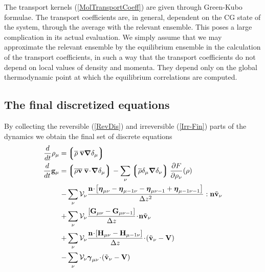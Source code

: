 \documentclass[b5paper,openright,11pt]{book}
\newcommand{\esc}{\!\cdot\!}
\newcommand{\llg}{\left\lgroup}
\newcommand{\rlg}{\right\rgroup}
\begin{document}
The  transport  kernels  (\ref{MolTransportCoeff}) are  given  through
Green-Kubo  formulae.  The  transport  coefficients  are, in  general,
dependent on the CG state of  the system, through the average with the
relevant  ensemble.  This  poses a  large complication  in its  actual
evaluation.  We simply  assume  that we  may
approximate the relevant  ensemble by the equilibrium  ensemble in the
calculation  of the  transport coefficients,  in such  a way  that the
transport coefficients  do not depend  on local values of  density and
momenta.  They depend only on  the global thermodynamic point at which
the equilibrium correlations are computed.

\subsection{The final discretized equations}
By   collecting  the   reversible   (\ref{RevDis})  and   irreversible
(\ref{Irr-Fin})  parts of  the dynamics  we  obtain the  final set  of
discrete equations
\begin{align}
\frac{d}{dt}\rho_\mu=&  \llg\overline{\rho} \; \overline{\bf v}\boldsymbol{\nabla}\delta_\mu \rlg
\nonumber\\
\frac{d}{dt}{\bf g}_\mu=&
\llg\overline{\rho} \overline{\bf v}\;\overline{\bf v}\esc\boldsymbol{\nabla}\delta_{\mu}\rlg
-\sum_\nu\llg\overline{\rho}\delta_{\mu}\boldsymbol{\nabla}\delta_{\nu}\rlg
\frac{\partial  F}{\partial \rho_{\nu}}(\rho)
\nonumber\\
-&\sum_{\nu}{\cal V}_\nu \frac{{\bf n}\esc\left[\boldsymbol{\eta}_{\mu\nu}-\boldsymbol{\eta}_{\mu-1\nu}-\boldsymbol{\eta}_{\mu\nu-1}+\boldsymbol{\eta}_{\mu-1\nu-1}\right]}{\Delta z^2}:{\bf n}\tilde{\bf v}_\nu
\nonumber\\
+&\sum_{\nu}{\cal V}_\nu\frac{\left[{\bf G}_{\mu\nu}-{\bf G}_{\mu\nu-1}\right]}{\Delta z}\esc{\bf n}\tilde{\bf v}_\nu
\nonumber\\
+&\sum_{\nu}{\cal V}_\nu\frac{{\bf n}\esc\left[{\bf H}_{\mu\nu}-{\bf H}_{\mu-1\nu}\right]}{\Delta z}\esc(\tilde{\bf v}_\nu-{\bf V})
\nonumber\\
-&\sum_{\nu}{\cal V}_\nu\boldsymbol{\gamma}_{\mu\nu}\esc(\tilde{\bf v}_\nu-{\bf V})
\label{TheoryDiscFin}
\end{align}
\end{document}
